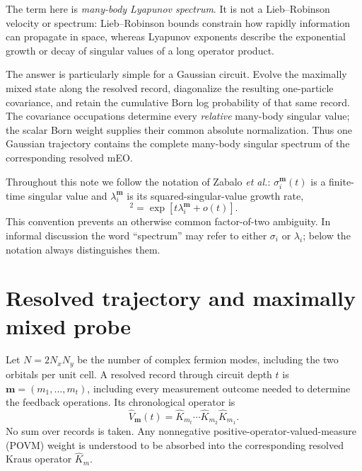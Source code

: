 \documentclass[aps,prb,twocolumn,floatfix,nofootinbib,superscriptaddress]{revtex4-2}
\begin{document}
The term here is \emph{many-body Lyapunov spectrum}.  It is not a Lieb--Robinson velocity or spectrum: Lieb--Robinson bounds constrain how rapidly information can propagate in space, whereas Lyapunov exponents describe the exponential growth or decay of singular values of a long operator product.

The answer is particularly simple for a Gaussian circuit.  Evolve the maximally mixed state along the resolved record, diagonalize the resulting one-particle covariance, and retain the cumulative Born log probability of that same record.  The covariance occupations determine every \emph{relative} many-body singular value; the scalar Born weight supplies their common absolute normalization.  Thus one Gaussian trajectory contains the complete many-body singular spectrum of the corresponding resolved mEO.

Throughout this note we follow the notation of Zabalo \emph{et al.}: \(\sigma_i^{\boldsymbol m}(t)\) is a finite-time singular value and \(\lambda_i^{\boldsymbol m}\) is its squared-singular-value growth rate,
\begin{equation}
 [\sigma_i^{\boldsymbol m}(t)]^2
 =\exp\!\left[t\lambda_i^{\boldsymbol m}+o(t)\right].
 \label{eq:zabalo-convention}
\end{equation}
This convention prevents an otherwise common factor-of-two ambiguity.  In informal discussion the word ``spectrum'' may refer to either \(\sigma_i\) or \(\lambda_i\); below the notation always distinguishes them.

\section{Resolved trajectory and maximally mixed probe}

Let \(N=2N_xN_y\) be the number of complex fermion modes, including the two orbitals per unit cell.  A resolved record through circuit depth \(t\) is \(\boldsymbol m=(m_1,\ldots,m_t)\), including every measurement outcome needed to determine the feedback operations.  Its chronological operator is
\begin{equation}
 \hat V_{\boldsymbol m}(t)
 =\hat K_{m_t}\cdots \hat K_{m_2}\hat K_{m_1}.
 \label{eq:record-operator}
\end{equation}
No sum over records is taken.  Any nonnegative positive-operator-valued-measure (POVM) weight is understood to be absorbed into the corresponding resolved Kraus operator \(\hat K_m\).
\end{document}
